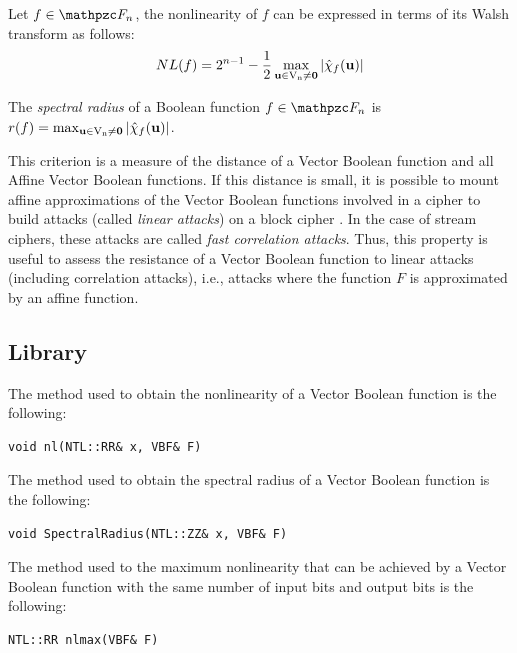 \begin{corollary}\label{cor:NonlinearityWalshBF}
Let $f \in \funct{F}_n$, the nonlinearity of $f$ can be expressed in terms of its Walsh transform as follows:
\begin{equation}
    \crit{NL}(f)=2^{n-1}-\frac{1}{2}\max_{\vec{u} \in \gf{V_n} \neq \vec{0}} |\walsh{\chi}_f(\vec{u})| 
\end{equation}
\end{corollary}

\begin{definition}
The \textit{spectral radius} of a Boolean function $f \in \funct{F}_n$ is $\crit{r}(f) = \max_{\vec{u} \in \gf{V_n} \neq \vec{0}} |\walsh{\chi}_f(\vec{u})|$.
\end{definition}

This criterion is a measure of the distance of a Vector Boolean function and all
Affine Vector Boolean functions. If this distance is small, it is possible to mount
affine approximations of the Vector Boolean functions involved in a cipher
to build attacks (called \textit{linear attacks}) on a block cipher \cite{Matsui:94}. In the case of stream ciphers, these attacks are called \textit{fast correlation attacks}. Thus, this property is useful 
to assess the resistance of a Vector Boolean function to linear attacks (including correlation attacks), 
i.e., attacks where the function $F$ is approximated by an affine function. 

\subsection{Library}

The method used to obtain the nonlinearity of a Vector Boolean function is the following:

\begin{verbatim}
void nl(NTL::RR& x, VBF& F)
\end{verbatim}

The method used to obtain the spectral radius of a Vector Boolean function is the following:

\begin{verbatim}
void SpectralRadius(NTL::ZZ& x, VBF& F)
\end{verbatim}

The method used to the maximum nonlinearity that can be achieved by a Vector Boolean function with the same number of input bits and output bits is the following:

\begin{verbatim}
NTL::RR nlmax(VBF& F)
\end{verbatim}


